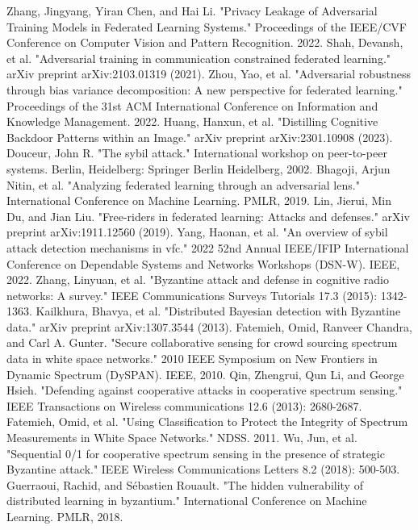 \documentclass[conference]{IEEEtran}
\begin{document}
\begin{thebibliography}{00}
     Zhang, Jingyang, Yiran Chen, and Hai Li. "Privacy Leakage of Adversarial Training Models in Federated Learning Systems." Proceedings of the IEEE/CVF Conference on Computer Vision and Pattern Recognition. 2022.
     Shah, Devansh, et al. "Adversarial training in communication constrained federated learning." arXiv preprint arXiv:2103.01319 (2021).
     Zhou, Yao, et al. "Adversarial robustness through bias variance decomposition: A new perspective for federated learning." Proceedings of the 31st ACM International Conference on Information and Knowledge Management. 2022.
     Huang, Hanxun, et al. "Distilling Cognitive Backdoor Patterns within an Image." arXiv preprint arXiv:2301.10908 (2023).
     Douceur, John R. "The sybil attack." International workshop on peer-to-peer systems. Berlin, Heidelberg: Springer Berlin Heidelberg, 2002.
     Bhagoji, Arjun Nitin, et al. "Analyzing federated learning through an adversarial lens." International Conference on Machine Learning. PMLR, 2019.
     Lin, Jierui, Min Du, and Jian Liu. "Free-riders in federated learning: Attacks and defenses." arXiv preprint arXiv:1911.12560 (2019).
     Yang, Haonan, et al. "An overview of sybil attack detection mechanisms in vfc." 2022 52nd Annual IEEE/IFIP International Conference on Dependable Systems and Networks Workshops (DSN-W). IEEE, 2022.
     Zhang, Linyuan, et al. "Byzantine attack and defense in cognitive radio networks: A survey." IEEE Communications Surveys  Tutorials 17.3 (2015): 1342-1363.
     Kailkhura, Bhavya, et al. "Distributed Bayesian detection with Byzantine data." arXiv preprint arXiv:1307.3544 (2013).
     Fatemieh, Omid, Ranveer Chandra, and Carl A. Gunter. "Secure collaborative sensing for crowd sourcing spectrum data in white space networks." 2010 IEEE Symposium on New Frontiers in Dynamic Spectrum (DySPAN). IEEE, 2010.
     Qin, Zhengrui, Qun Li, and George Hsieh. "Defending against cooperative attacks in cooperative spectrum sensing." IEEE Transactions on Wireless communications 12.6 (2013): 2680-2687.
     Fatemieh, Omid, et al. "Using Classification to Protect the Integrity of Spectrum Measurements in White Space Networks." NDSS. 2011.
     Wu, Jun, et al. "Sequential 0/1 for cooperative spectrum sensing in the presence of strategic Byzantine attack." IEEE Wireless Communications Letters 8.2 (2018): 500-503.
     Guerraoui, Rachid, and Sébastien Rouault. "The hidden vulnerability of distributed learning in byzantium." International Conference on Machine Learning. PMLR, 2018.

\end{thebibliography}
\end{document}
